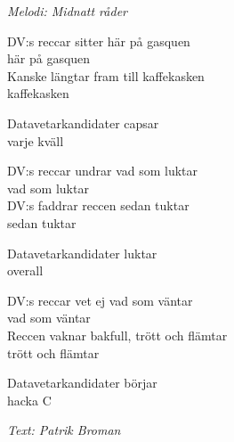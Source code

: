 {\footnotesize\textit{Melodi: Midnatt råder}}\par
\vspace{10pt}
DV:s reccar sitter här på gasquen \\
här på gasquen\\
Kanske längtar fram till kaffekasken\\
kaffekasken\par
\vspace{10pt}
Datavetarkandidater capsar\\
varje kväll\par
\vspace{10pt}
DV:s reccar undrar vad som luktar\\
vad som luktar\\
DV:s faddrar reccen sedan tuktar\\
sedan tuktar\par
\vspace{10pt}
Datavetarkandidater luktar\\
overall\par
\vspace{10pt}
DV:s reccar vet ej vad som väntar\\
vad som väntar\\
Reccen vaknar bakfull, trött och flämtar\\
trött och flämtar\par
\vspace{10pt}
Datavetarkandidater börjar\\
hacka C\par
\vspace{10pt}
{\footnotesize\textit{Text: Patrik Broman}}
